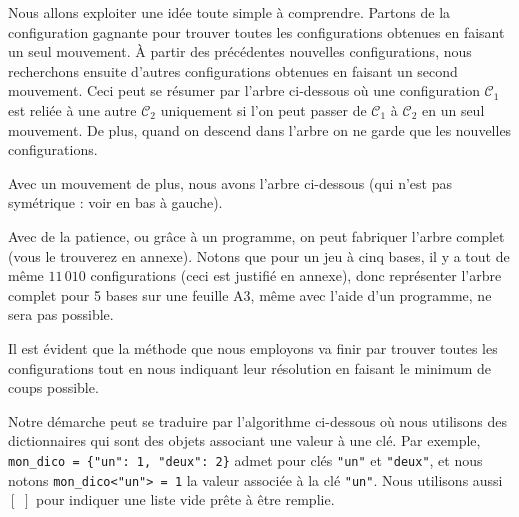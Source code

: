 Nous allons exploiter une idée toute simple à comprendre. Partons de la configuration gagnante pour trouver toutes les configurations obtenues en faisant un seul mouvement.
À partir des précédentes nouvelles configurations, nous recherchons ensuite d'autres configurations obtenues en faisant un second mouvement.
Ceci peut se résumer par l'arbre ci-dessous où une configuration $\mathcal{C}_1$ est reliée à une autre $\mathcal{C}_2$ uniquement si l'on peut passer de $\mathcal{C}_1$ à $\mathcal{C}_2$ en un seul mouvement. De plus, quand on descend dans l'arbre on ne garde que les nouvelles configurations.




Avec un mouvement de plus, nous avons l'arbre ci-dessous (qui n'est pas symétrique : voir en bas à gauche).




Avec de la patience, ou grâce à un programme, on peut fabriquer l'arbre complet (vous le trouverez en annexe). Notons que pour un jeu à cinq bases, il y a tout de même $11\,010$ configurations (ceci est justifié en annexe), donc représenter l'arbre complet pour 5 bases sur une feuille A3, même avec l'aide d'un programme, ne sera pas possible. 


\medskip

Il est évident que la méthode que nous employons va finir par trouver toutes les configurations tout en nous indiquant leur résolution en faisant le minimum de coups possible. 


\medskip

Notre démarche peut se traduire par l'algorithme ci-dessous où nous utilisons des dictionnaires qui sont des objets associant une valeur à une clé. Par exemple, \verb+mon_dico = {"un": 1, "deux": 2}+ admet pour clés \verb+"un"+ et \verb+"deux"+, et nous notons \verb+mon_dico<"un"> = 1+ la valeur associée à la clé \verb+"un"+.
Nous utilisons aussi $[ \,\, ]$ pour indiquer une liste vide prête à être remplie.


\bigskip

